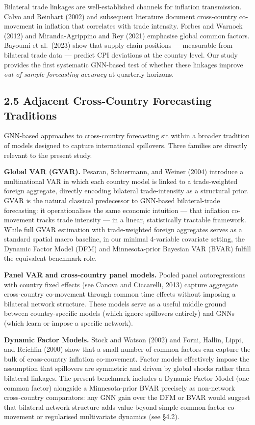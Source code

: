 \documentclass[
]{article}
\begin{document}
Bilateral trade linkages are well-established channels for inflation
transmission. Calvo and Reinhart (2002) and subsequent literature
document cross-country co-movement in inflation that correlates with
trade intensity. Forbes and Warnock (2012) and Miranda-Agrippino and Rey
(2021) emphasise global common factors. Bayoumi et al.~(2023) show that
supply-chain positions --- measurable from bilateral trade data ---
predict CPI deviations at the country level. Our study provides the
first systematic GNN-based test of whether these linkages improve
\emph{out-of-sample forecasting accuracy} at quarterly horizons.

\subsection{2.5 Adjacent Cross-Country Forecasting Traditions}\label{adjacent-cross-country-forecasting-traditions}

GNN-based approaches to cross-country forecasting sit within a broader tradition of models designed to capture international spillovers. Three families are directly relevant to the present study.

\textbf{Global VAR (GVAR).} Pesaran, Schuermann, and Weiner (2004) introduce a multinational VAR in which each country model is linked to a trade-weighted foreign aggregate, directly encoding bilateral trade-intensity as a structural prior. GVAR is the natural classical predecessor to GNN-based bilateral-trade forecasting: it operationalises the same economic intuition --- that inflation co-movement tracks trade intensity --- in a linear, statistically tractable framework. While full GVAR estimation with trade-weighted foreign aggregates serves as a standard spatial macro baseline, in our minimal 4-variable covariate setting, the Dynamic Factor Model (DFM) and Minnesota-prior Bayesian VAR (BVAR) fulfill the equivalent benchmark role.

\textbf{Panel VAR and cross-country panel models.} Pooled panel autoregressions with country fixed effects (see Canova and Ciccarelli, 2013) capture aggregate cross-country co-movement through common time effects without imposing a bilateral network structure. These models serve as a useful middle ground between country-specific models (which ignore spillovers entirely) and GNNs (which learn or impose a specific network).

\textbf{Dynamic Factor Models.} Stock and Watson (2002) and Forni, Hallin, Lippi, and Reichlin (2000) show that a small number of common factors can capture the bulk of cross-country inflation co-movement. Factor models effectively impose the assumption that spillovers are symmetric and driven by global shocks rather than bilateral linkages. The present benchmark includes a Dynamic Factor Model (one common factor) alongside a Minnesota-prior BVAR precisely as non-network cross-country comparators: any GNN gain over the DFM or BVAR would suggest that bilateral network structure adds value beyond simple common-factor co-movement or regularised multivariate dynamics (see \S4.2).
\end{document}
